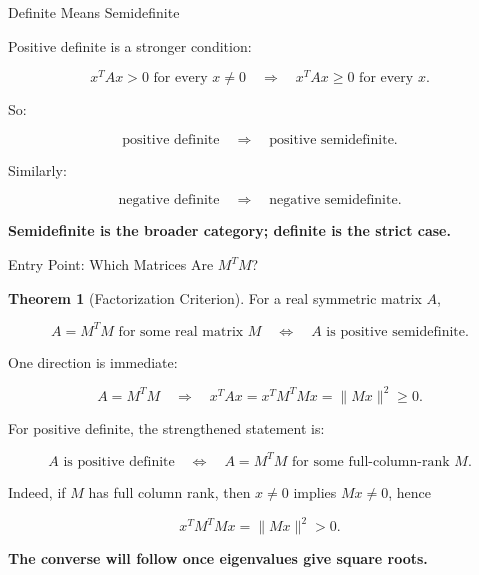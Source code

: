 \documentclass[10pt]{beamer}
\theoremstyle{definition}
\newtheorem{thm}{Theorem}[section]
\newcommand{\x}[1]{\alert{\textbf{#1}}}
\begin{document}
\begin{frame}{Definite Means Semidefinite}

Positive definite is a stronger condition:

$$
x^TAx>0\text{ for every }x\ne0
\quad\Longrightarrow\quad
x^TAx\ge0\text{ for every }x.
$$

\vfill

So:

$$
\boxed{\text{positive definite}\quad\Longrightarrow\quad\text{positive semidefinite}.}
$$

\vfill

Similarly:

$$
\boxed{\text{negative definite}\quad\Longrightarrow\quad\text{negative semidefinite}.}
$$

\begin{center}
\x{Semidefinite is the broader category; definite is the strict case.}
\end{center}

\end{frame}


\begin{frame}[shrink=5]{Entry Point: Which Matrices Are $M^TM$?}

\begin{thm}[Factorization Criterion]
For a real symmetric matrix $A$,

$$
\boxed{A=M^TM\text{ for some real matrix }M}
\quad\Longleftrightarrow\quad
\boxed{A\text{ is positive semidefinite}.}
$$
\end{thm}

\vfill

One direction is immediate:

$$
A=M^TM
\quad\Longrightarrow\quad
x^TAx=x^TM^TMx=\|Mx\|^2\ge0.
$$

\vfill

For positive definite, the strengthened statement is:

$$
\boxed{
A\text{ is positive definite}
\quad\Longleftrightarrow\quad
A=M^TM\text{ for some full-column-rank }M.
}
$$

\vfill

Indeed, if $M$ has full column rank, then $x\ne0$ implies $Mx\ne0$, hence

$$
x^TM^TMx=\|Mx\|^2>0.
$$

\vfill

\begin{center}
\x{The converse will follow once eigenvalues give square roots.}
\end{center}

\end{frame}
\end{document}
